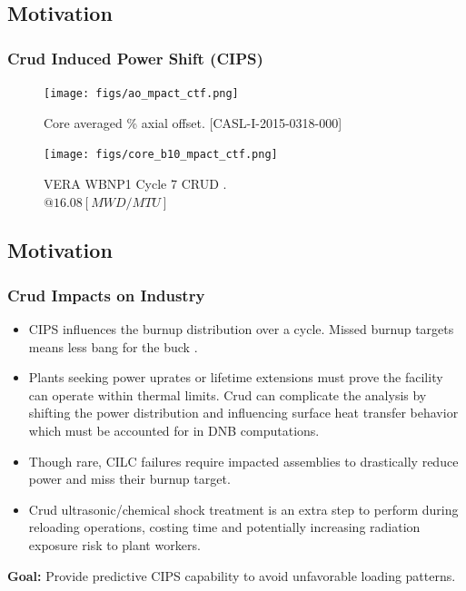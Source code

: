 \documentclass[t, pdftex]{beamer}
\begin{document}
\subsection*{Motivation}
\begin{frame}
    \frametitle{Crud Induced Power Shift (CIPS)}
    \begin{figure}
        \centering
        \begin{minipage}{.5\textwidth}
            \centering
            \texttt{[image: figs/ao\_mpact\_ctf.png]}
            \caption{Core averaged \% axial offset.  [CASL-I-2015-0318-000]}
        \end{minipage}%
        \begin{minipage}{.5\textwidth}
            \centering
            \texttt{[image: figs/core\_b10\_mpact\_ctf.png]}
            \caption{VERA WBNP1 Cycle 7 CRUD . \\ $@ 16.08 [MWD/MTU]$}
        \end{minipage}
    \end{figure}
\end{frame}

\subsection*{Motivation}
\begin{frame}
\frametitle{Crud Impacts on Industry}
\vspace{-12pt}
\begin{itemize}
    \item CIPS influences the burnup distribution over a cycle.  Missed burnup targets means less bang for the buck  .
    \item Plants seeking power uprates or lifetime extensions must prove the facility can operate within thermal limits.  Crud can complicate the analysis by shifting the power distribution and influencing surface heat transfer behavior which must be accounted for in DNB computations.
    \item Though rare, CILC failures require impacted assemblies to drastically reduce power and miss their burnup target.
    \item Crud ultrasonic/chemical shock treatment is an extra step to perform during reloading operations, costing time and potentially increasing radiation exposure risk to plant workers.
\end{itemize}
\textbf{Goal:} Provide predictive CIPS capability to avoid unfavorable loading patterns.
\end{frame}
\end{document}

